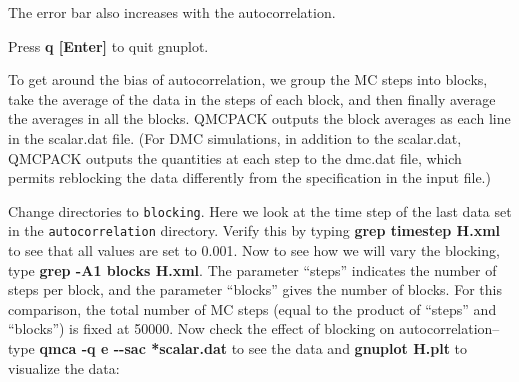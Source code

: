 
The error bar also increases with the autocorrelation.  

Press \textbf{q [Enter]} to quit gnuplot.

To get around the bias of autocorrelation, we group the MC steps into blocks,
take the average of the data in the steps of each block, and then finally
average the averages in all the blocks.  QMCPACK outputs the block averages as
each line in the scalar.dat file.  (For DMC simulations, in addition to the
scalar.dat, QMCPACK outputs the quantities at each step to the dmc.dat file,
which permits reblocking the data differently from the specification in the
input file.) 

Change directories to \texttt{blocking}.  Here we look at the time step of the
last data set in the \texttt{autocorrelation} directory.  Verify this by typing
\textbf{grep timestep H.xml} to see that all values are set to 0.001.  Now to
see how we will vary the blocking, type \textbf{grep -A1 blocks H.xml}.  The
parameter ``steps'' indicates the number of steps per block, and the parameter
``blocks'' gives the number of blocks.  For this comparison, the total number
of MC steps (equal to the product of ``steps'' and ``blocks'') is fixed at
50000.  Now check the effect of blocking on autocorrelation--type \textbf{qmca
-q e {-}{-}sac *scalar.dat} to see the data and \textbf{gnuplot H.plt} to
visualize the data:


